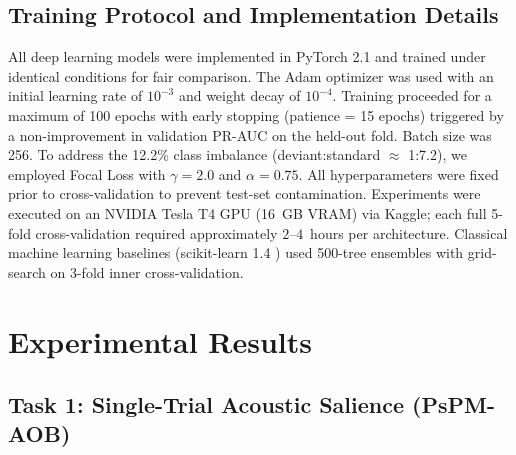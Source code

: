 \documentclass[journal]{IEEEtran}
\begin{document}
\subsection{Training Protocol and Implementation Details}
All deep learning models were implemented in PyTorch 2.1 \cite{paszke2019pytorch} and trained under identical conditions for fair comparison. The Adam optimizer \cite{kingma2014adam} was used with an initial learning rate of $10^{-3}$ and weight decay of $10^{-4}$. Training proceeded for a maximum of 100 epochs with early stopping (patience = 15 epochs) triggered by a non-improvement in validation PR-AUC on the held-out fold. Batch size was 256. To address the 12.2\% class imbalance (deviant:standard $\approx$ 1:7.2), we employed Focal Loss \cite{lin2017focal} with $\gamma = 2.0$ and $\alpha = 0.75$. All hyperparameters were fixed prior to cross-validation to prevent test-set contamination. Experiments were executed on an NVIDIA Tesla T4 GPU (16~GB VRAM) via Kaggle; each full 5-fold cross-validation required approximately $2\text{--}4$~hours per architecture. Classical machine learning baselines (scikit-learn 1.4 \cite{pedregosa2011scikit}) used 500-tree ensembles with grid-search on 3-fold inner cross-validation.

\section{Experimental Results}

\subsection{Task 1: Single-Trial Acoustic Salience (PsPM-AOB)}
\end{document}
